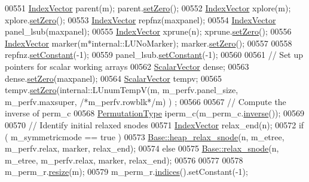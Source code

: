 \begin{DoxyCode}
00551   \hyperlink{group___core___module}{IndexVector} parent(m); parent.\hyperlink{class_eigen_1_1_plain_object_base_ac21ad5f989f320e46958b75ac8d9a1da}{setZero}();
00552   \hyperlink{group___core___module}{IndexVector} xplore(m); xplore.\hyperlink{class_eigen_1_1_plain_object_base_ac21ad5f989f320e46958b75ac8d9a1da}{setZero}();
00553   \hyperlink{group___core___module}{IndexVector} repfnz(maxpanel);
00554   \hyperlink{group___core___module}{IndexVector} panel\_lsub(maxpanel);
00555   \hyperlink{group___core___module}{IndexVector} xprune(n); xprune.\hyperlink{class_eigen_1_1_plain_object_base_ac21ad5f989f320e46958b75ac8d9a1da}{setZero}();
00556   \hyperlink{group___core___module}{IndexVector} marker(m*internal::LUNoMarker); marker.\hyperlink{class_eigen_1_1_plain_object_base_ac21ad5f989f320e46958b75ac8d9a1da}{setZero}();
00557   
00558   repfnz.\hyperlink{class_eigen_1_1_plain_object_base_ac8dea1df3d92b752cc683ff42abf6f9b}{setConstant}(-1); 
00559   panel\_lsub.\hyperlink{class_eigen_1_1_plain_object_base_ac8dea1df3d92b752cc683ff42abf6f9b}{setConstant}(-1);
00560   
00561   \textcolor{comment}{// Set up pointers for scalar working arrays }
00562   \hyperlink{group___core___module}{ScalarVector} dense; 
00563   dense.\hyperlink{class_eigen_1_1_plain_object_base_ac21ad5f989f320e46958b75ac8d9a1da}{setZero}(maxpanel);
00564   \hyperlink{group___core___module}{ScalarVector} tempv; 
00565   tempv.\hyperlink{class_eigen_1_1_plain_object_base_ac21ad5f989f320e46958b75ac8d9a1da}{setZero}(internal::LUnumTempV(m, m\_perfv.panel\_size, m\_perfv.maxsuper, \textcolor{comment}{/*m\_perfv.rowblk*/}m) )
      ;
00566   
00567   \textcolor{comment}{// Compute the inverse of perm\_c}
00568   \hyperlink{group___core___module}{PermutationType} iperm\_c(m\_perm\_c.\hyperlink{group___core___module_adb9af427f317202366c2832876064eb3}{inverse}()); 
00569   
00570   \textcolor{comment}{// Identify initial relaxed snodes}
00571   \hyperlink{group___core___module}{IndexVector} relax\_end(n);
00572   \textcolor{keywordflow}{if} ( m\_symmetricmode == \textcolor{keyword}{true} ) 
00573     \hyperlink{group___sparse_l_u___module_a88952ce33c968374b149e31d0539178d}{Base::heap\_relax\_snode}(n, m\_etree, m\_perfv.relax, marker, relax\_end);
00574   \textcolor{keywordflow}{else}
00575     \hyperlink{group___sparse_l_u___module_a33672df380f94e774c5a6919d3474af4}{Base::relax\_snode}(n, m\_etree, m\_perfv.relax, marker, relax\_end);
00576   
00577   
00578   m\_perm\_r.\hyperlink{group___core___module_a0e0fda6e84d69e02432e4770359bb532}{resize}(m); 
00579   m\_perm\_r.\hyperlink{group___core___module_a2f1ab379207fcd1ceb33941e25cf50c2}{indices}().setConstant(-1);

\end{DoxyCode}
